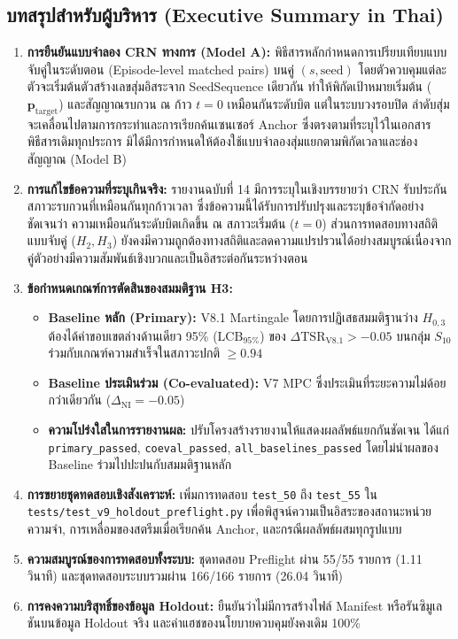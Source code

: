 \documentclass[10pt,a4paper]{article}
\begin{document}
\subsection{\texorpdfstring{บทสรุปสำหรับผู้บริหาร (Executive Summary in Thai)}{Executive Summary in Thai}}
{\thaifont\small
\begin{enumerate}
    \item \textbf{การยืนยันแบบจำลอง CRN ทางการ (Model A):} พิธีสารหลักกำหนดการเปรียบเทียบแบบจับคู่ในระดับตอน (Episode-level matched pairs) บนคู่ $(s, \text{seed})$ โดยตัวควบคุมแต่ละตัวจะเริ่มต้นตัวสร้างเลขสุ่มอิสระจาก SeedSequence เดียวกัน ทำให้พิกัดเป้าหมายเริ่มต้น ($\mathbf{p}_{\mathrm{target}}$) และสัญญาณรบกวน ณ ก้าว $t=0$ เหมือนกันระดับบิต แต่ในระบบวงรอบปิด ลำดับสุ่มจะเคลื่อนไปตามการกระทำและการเรียกค้นเซนเซอร์ Anchor ซึ่งตรงตามที่ระบุไว้ในเอกสารพิธีสารเดิมทุกประการ มิได้มีการกำหนดให้ต้องใช้แบบจำลองสุ่มแยกตามพิกัดเวลาและช่องสัญญาณ (Model B)
    \item \textbf{การแก้ไขข้อความที่ระบุเกินจริง:} รายงานฉบับที่ 14 มีการระบุในเชิงบรรยายว่า CRN รับประกันสภาวะรบกวนที่เหมือนกันทุกก้าวเวลา ซึ่งข้อความนี้ได้รับการปรับปรุงและระบุข้อจำกัดอย่างชัดเจนว่า ความเหมือนกันระดับบิตเกิดขึ้น ณ สภาวะเริ่มต้น ($t=0$) ส่วนการทดสอบทางสถิติแบบจับคู่ ($H_2, H_3$) ยังคงมีความถูกต้องทางสถิติและลดความแปรปรวนได้อย่างสมบูรณ์เนื่องจากคู่ตัวอย่างมีความสัมพันธ์เชิงบวกและเป็นอิสระต่อกันระหว่างตอน
    \item \textbf{ข้อกำหนดเกณฑ์การตัดสินของสมมติฐาน H3:}
    \begin{itemize}
        \item \textbf{Baseline หลัก (Primary):} V8.1 Martingale โดยการปฏิเสธสมมติฐานว่าง $H_{0,3}$ ต้องได้ค่าขอบเขตล่างด้านเดียว 95\% ($\text{LCB}_{95\%}$) ของ $\Delta\mathrm{TSR}_{\mathrm{V8.1}} > -0.05$ บนกลุ่ม $S_{10}$ ร่วมกับเกณฑ์ความสำเร็จในสภาวะปกติ $\ge 0.94$
        \item \textbf{Baseline ประเมินร่วม (Co-evaluated):} V7 MPC ซึ่งประเมินที่ระยะความไม่ด้อยกว่าเดียวกัน ($\Delta_{\mathrm{NI}} = -0.05$)
        \item \textbf{ความโปร่งใสในการรายงานผล:} ปรับโครงสร้างรายงานให้แสดงผลลัพธ์แยกกันชัดเจน ได้แก่ \texttt{primary\_passed}, \texttt{coeval\_passed}, \texttt{all\_baselines\_passed} โดยไม่นำผลของ Baseline ร่วมไปปะปนกับสมมติฐานหลัก
    \end{itemize}
    \item \textbf{การขยายชุดทดสอบเชิงสังเคราะห์:} เพิ่มการทดสอบ \texttt{test\_50} ถึง \texttt{test\_55} ใน \texttt{tests/test\_v9\_holdout\_preflight.py} เพื่อพิสูจน์ความเป็นอิสระของสถานะหน่วยความจำ, การเหลื่อมของสตรีมเมื่อเรียกค้น Anchor, และกรณีผลลัพธ์ผสมทุกรูปแบบ
    \item \textbf{ความสมบูรณ์ของการทดสอบทั้งระบบ:} ชุดทดสอบ Preflight ผ่าน 55/55 รายการ (1.11 วินาที) และชุดทดสอบระบบรวมผ่าน 166/166 รายการ (26.04 วินาที)
    \item \textbf{การคงความบริสุทธิ์ของข้อมูล Holdout:} ยืนยันว่าไม่มีการสร้างไฟล์ Manifest หรือรันซิมูเลชันบนข้อมูล Holdout จริง และค่าแฮชของนโยบายควบคุมยังคงเดิม 100\%
\end{enumerate}
}
\end{document}
